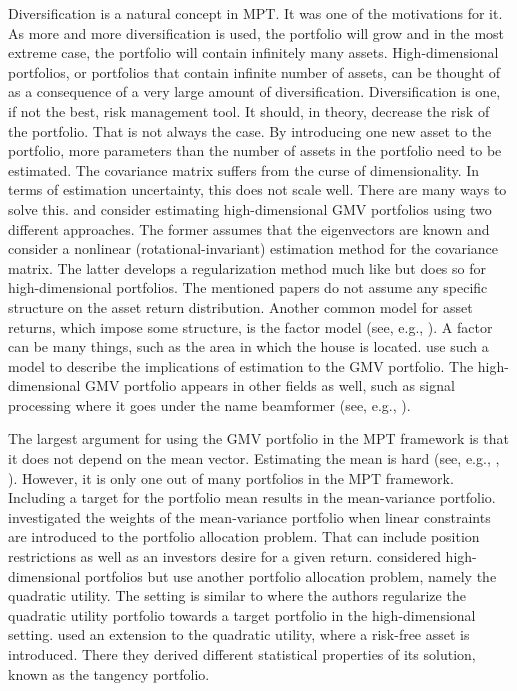Diversification is a natural concept in MPT.
It was one of the motivations for it.
As more and more diversification is used, the portfolio will grow and in the most extreme case, the portfolio will contain infinitely many assets.
High-dimensional portfolios, or portfolios that contain infinite number of assets, can be thought of as a consequence of a very large amount of diversification.
Diversification is one, if not the best, risk management tool.
It should, in theory, decrease the risk of the portfolio. 
That is not always the case.
By introducing one new asset to the portfolio, more parameters than the number of assets in the portfolio need to be estimated. 
The covariance matrix suffers from the curse of dimensionality. 
In terms of estimation uncertainty, this does not scale well.
There are many ways to solve this.
\citet{lw20} and \citet{bodnar2018estimation} consider estimating high-dimensional GMV portfolios using two different approaches.
The former assumes that the eigenvectors are known and consider a nonlinear (rotational-invariant) estimation method for the covariance matrix. 
The latter develops a regularization method much like \citet{frahm2010} but does so for high-dimensional portfolios.
The mentioned papers do not assume any specific structure on the asset return distribution. 
Another common model for asset returns, which impose some structure, is the factor model (see, e.g., \citet{ross2013arbitrage}). 
A factor can be many things, such as the area in which the house is located.
\citet{ding2020high} use such a model to describe the implications of estimation to the GMV portfolio.
The high-dimensional GMV portfolio appears in other fields as well, such as signal processing where it goes under the name beamformer (see, e.g., \citet{LiStoicaWang2004}). 

The largest argument for using the GMV portfolio in the MPT framework is that it does not depend on the mean vector.
Estimating the mean is hard (see, e.g., \citet{merton1980estimating}, \citet{best1991sensitivity}).
However, it is only one out of many portfolios in the MPT framework.
Including a target for the portfolio mean results in the mean-variance portfolio.
\citet{el2010high} investigated the weights of the mean-variance portfolio when linear constraints are introduced to the portfolio allocation problem.
That can include position restrictions as well as an investors desire for a given return.
\citet{bodnarokhrinparolya2020} considered high-dimensional portfolios but use another portfolio allocation problem, namely the quadratic utility.
The setting is similar to \citet{bodnar2018estimation} where the authors regularize the quadratic utility portfolio towards a target portfolio in the high-dimensional setting.
\citet{karlsson2021statistical} used an extension to the quadratic utility, where a risk-free asset is introduced.
There they derived different statistical properties of its solution, known as the tangency portfolio.


